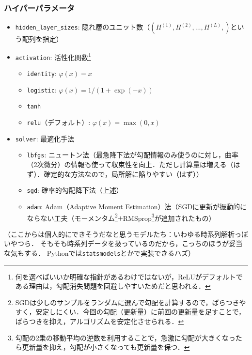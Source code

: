 \documentclass[a4paper,lualatex,ja=standard,oneside,fleqn]{bxjsarticle}
\begin{document}
\subsubsection*{ハイパーパラメータ}
\begin{itemize}
  \item \verb|hidden_layer_sizes|: 隠れ層のユニット数（$(H^{(1)},H^{(2)},\ldots,H^{(L)},)$という配列を指定）
  \item \verb|activation|: 活性化関数\footnote{何を選べばいいか明確な指針があるわけではないが，ReLUがデフォルトである理由は，勾配消失問題を回避しやすいためだと思われる．}
  \begin{itemize}
    \item \verb|identity|: $\varphi(x) = x$
    \item \verb|logistic|: $\varphi(x) = 1 / (1 + \exp(-x))$
    \item \verb|tanh|
    \item \verb|relu|（デフォルト）: $\varphi(x) = \max(0, x)$
  \end{itemize}
  \item \verb|solver|: 最適化手法
  \begin{itemize}
    \item \verb|lbfgs|: ニュートン法（最急降下法が勾配情報のみ使うのに対し，曲率（2次微分）の情報も使って収束性を向上．ただし計算量は増える（はず）．確定的な方法なので，局所解に陥りやすい（はず））
    \item \verb|sgd|: 確率的勾配降下法（上述）
    \item \verb|adam|: Adam（Adaptive Moment Estimation）法（SGDに更新が振動的にならない工夫（モーメンタム\footnote{SGDは少しのサンプルをランダムに選んで勾配を計算するので，ばらつきやすく，安定しにくい．今回の勾配（更新量）に前回の更新量を足すことで，ばらつきを抑え，アルゴリズムを安定化させられる．}$+$RMSprop\footnote{勾配の2乗の移動平均の逆数を利用することで，急激に勾配が大きくなったら更新量を抑え，勾配が小さくなっても更新量を保つ．}が追加されたもの）
  \end{itemize}
\end{itemize}

\vspace{2\baselineskip}

（ここからは個人的にできそうだなと思うモデルたち：いわゆる時系列解析っぽいやつら．
そもそも時系列データを扱っているのだから，こっちのほうが妥当な気もする．
Pythonでは\verb|statsmodels|とかで実装できるハズ）
\end{document}
